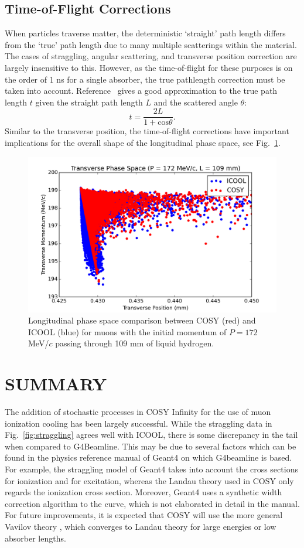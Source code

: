 \documentclass{jacow}
\begin{document}
\subsection{Time-of-Flight Corrections}
When particles traverse matter, the deterministic `straight' path length differs from the `true' path length due to many multiple scatterings within the material. The cases of straggling, angular scattering, and transverse position correction are largely insensitive to this. However, as the time-of-flight for these purposes is on the order of 1 ns for a single absorber, the true pathlength correction must be taken into account. Reference~\cite{Bielajew} gives a good approximation to the true path length $t$ given the straight path length $L$ and the scattered angle $\theta$:
\[
t = \frac{2L}{1+\text{cos}\theta}.
\]
Similar to the transverse position, the time-of-flight corrections have important implications for the overall shape of the longitudinal phase space, see Fig.~\ref{fig:tof}.

\begin{figure}[htbf]
\centering
\includegraphics[width=\columnwidth]{Figures/tof}
\caption{Longitudinal phase space comparison between COSY (red) and ICOOL (blue) for muons with the initial momentum of $P=172$ MeV/$c$ passing through 109 mm of liquid hydrogen.}
\label{fig:tof}
\end{figure}

\section{SUMMARY}
The addition of stochastic processes in COSY Infinity for the use of muon ionization cooling has been largely successful. While the straggling data in Fig.~\ref{fig:straggling} agrees well with ICOOL, there is some discrepancy in the tail when compared to G4Beamline. This may be due to several factors which can be found in the physics reference manual of Geant4 \cite{GEANT4} on which G4beamline is based. For example, the straggling model of Geant4 takes into account the cross sections for ionization and for excitation, whereas the Landau theory used in COSY only regards the ionization cross section. Moreover, Geant4 uses a synthetic width correction algorithm to the curve, which is not elaborated in detail in the manual. For future improvements, it is expected that COSY will use the more general Vavilov theory \cite{VAVILOV}, which converges to Landau theory for large energies or low absorber lengths. 
\end{document}
